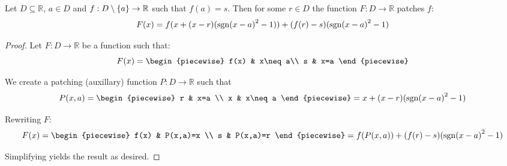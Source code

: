 \begin{theorem}
    Let $D\subseteq\mathbb{R}$, $a\in D$ and $f:D\setminus\{a\}\to\mathbb{R}$ such that $f(a)=s$. Then for some $r\in D$ the function $F:D\to\mathbb{R}$ patches $f$:
    $$
        F(x) = f(x+(x-r)(\sgn{x-a}^2-1))+(f(r)-s)(\sgn{x-a}^2-1)
    $$

    \begin{proof}
        Let $F:D\to\mathbb{R}$ be a function such that:
        $$
            F(x) = \begin{piecewise}
                f(x) & x\neq a\\
                s & x=a
            \end{piecewise}
        $$

        We create a patching (auxillary) function $P:D\to\mathbb{R}$ such that
        $$
            P(x,a) = \begin{piecewise}
                r & x=a \\
                x & x\neq a
            \end{piecewise} = x + (x-r)(\sgn{x-a}^2-1)
        $$

        Rewriting $F$:
        $$
            F(x) = \begin{piecewise}
                f(x) & P(x,a)=x \\
                s & P(x,a)=r
            \end{piecewise} = f(P(x,a)) + (f(r)-s)(\sgn{x-a}^2-1)
        $$

        Simplifying yields the result as desired.
    \end{proof}
\end{theorem}

\newpage